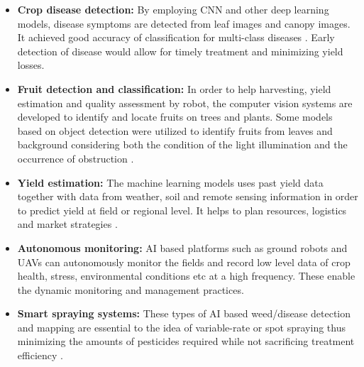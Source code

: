 \begin{itemize}
    \item \textbf{Crop disease detection:}  
    By employing CNN and other deep learning models, disease symptoms are detected from leaf images and canopy images. It achieved good accuracy of classification for multi-class diseases \cite{AIReview2025}. Early detection of disease would allow for timely treatment and minimizing yield losses.

    \item \textbf{Fruit detection and classification:}  
    In order to help harvesting, yield estimation and quality assessment by robot, the computer vision systems are developed to identify and locate fruits on trees and plants. Some models based on object detection were utilized to identify fruits from leaves and background considering both the condition of the light illumination and the occurrence of obstruction \cite{AgriPortugal2024}.

    \item \textbf{Yield estimation:}  
    The machine learning models uses past yield data together with data from weather, soil and remote sensing information in order to predict yield at field or regional level. It helps to plan resources, logistics and market strategies \cite{AppsAgri2022}.

    \item \textbf{Autonomous monitoring:}  
    AI based platforms such as ground robots and UAVs can autonomously monitor the fields and record low level data of crop health, stress, environmental conditions etc at a high frequency. These enable the dynamic monitoring and management practices.

    \item \textbf{Smart spraying systems:}  
    These types of AI based weed/disease detection and mapping are essential to the idea of variable-rate or spot spraying thus minimizing the amounts of pesticides required while not sacrificing treatment efficiency \cite{AIoTAgri2025}.
\end{itemize}

